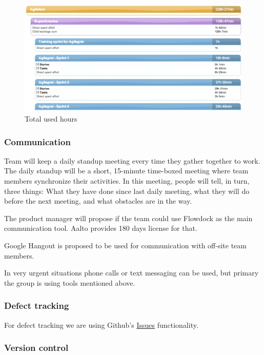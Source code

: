 \begin{figure}[H]
\centering
\includegraphics[width=1\textwidth]{imgs/totalhours.png}
\caption{Total used hours}
\label{fig:totalhours}
\end{figure}

\subsubsection{Communication}

Team will keep a daily standup meeting every time they gather together to work. 
The daily standup will be a short, 15-minute time-boxed meeting where team 
members synchronize their activities. In this meeting, people will tell, in 
turn, three things: What they have done since last daily meeting, what they 
will do before the next meeting, and what obstacles are in the way.  

The product manager will propose if the team could use Flowdock as the main 
communication tool. Aalto provides 180 days license for that.

Google Hangout is proposed to be used for communication with off-site team 
members.

In very urgent situations phone calls or text messaging can be used, but 
primary the group is using tools mentioned above.

\subsubsection{Defect tracking}

For defect tracking we are using Github's
\href{https://github.com/soberit/mobilefant/issues?state=open}{Issues}
functionality.

\subsubsection{Version control}

